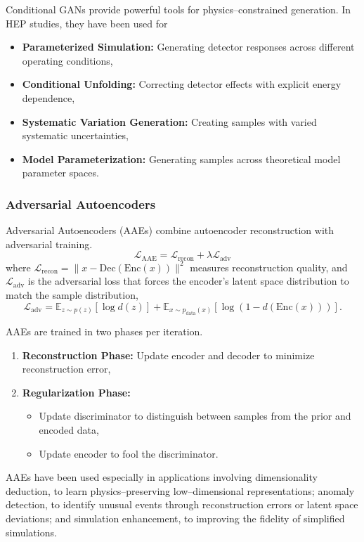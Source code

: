         Conditional GANs provide powerful tools for physics--constrained generation.
        In HEP studies, they have been used for
        \begin{itemize}
        \item \textbf{Parameterized Simulation:} Generating detector responses across different operating conditions,
        \item \textbf{Conditional Unfolding:} Correcting detector effects with explicit energy dependence,
        \item \textbf{Systematic Variation Generation:} Creating samples with varied systematic uncertainties,
        \item \textbf{Model Parameterization:} Generating samples across theoretical model parameter spaces.
        \end{itemize}

    \subsubsection{Adversarial Autoencoders}
        Adversarial Autoencoders (AAEs) combine autoencoder reconstruction with adversarial training.
        \begin{equation}
            \mathcal{L}_{\text{AAE}} = \mathcal{L}_{\text{recon}} + \lambda \mathcal{L}_{\text{adv}}
        \end{equation}
        where \(\mathcal{L}_{\text{recon}} = \|x - \text{Dec}(\text{Enc}(x))\|^2\) measures reconstruction quality, and \(\mathcal{L}_{\text{adv}}\) is the adversarial loss that forces the encoder's latent space distribution to match the sample distribution,
        \begin{equation}
            \mathcal{L}_{\text{adv}} = \mathbb{E}_{z \sim p(z)}[\log d(z)] + \mathbb{E}_{x \sim p_{\text{data}}(x)}[\log(1 - d(\text{Enc}(x)))].
        \end{equation}

        AAEs are trained in two phases per iteration.
        \begin{enumerate}
            \item \textbf{Reconstruction Phase:} Update encoder and decoder to minimize reconstruction error,
            \item \textbf{Regularization Phase:}
            \begin{itemize}
                \item Update discriminator to distinguish between samples from the prior and encoded data,
                \item Update encoder to fool the discriminator.
            \end{itemize}
        \end{enumerate}
        AAEs have been used especially in applications involving dimensionality deduction, to learn physics--preserving low--dimensional representations;
        anomaly detection, to identify unusual events through reconstruction errors or latent space deviations; and simulation enhancement, to improving the fidelity of simplified simulations.
